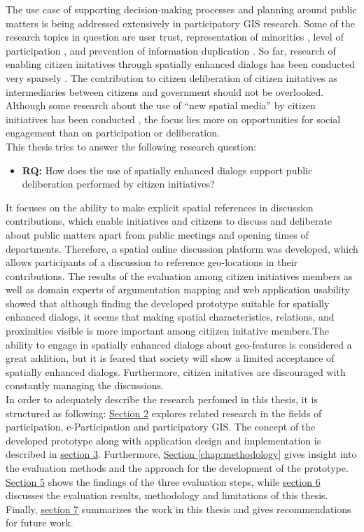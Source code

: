 The use case of supporting decision-making processes and planning around public matters is being addressed extensively in participatory GIS research. Some of the research topics in question are user trust, representation of minorities \cite{Carver2001_PPGIS_Cyberdemocracy}, level of participation \cite{Steinmann2005_Combination_Ladder_GIS}, and prevention of information duplication \cite{Hopfer2007_Communication}. So far, research of enabling citizen initatives through spatially enhanced dialogs has been conducted very sparsely \cite{Cai2009_spatial_annotation_deliberation}. The contribution to citizen deliberation of citizen initatives as intermediaries between citizens and government should not be overlooked. Although some research about the use of ``new spatial media'' by citizen initiatives has been conducted \cite{Elwood2013_NewSpatialMedia}, the focus lies more on opportunities for social engagement than on participation or deliberation.\\
This thesis tries to answer the following research question:
\begin{itemize}
  \item[] \textbf{RQ:} How does the use of spatially enhanced dialogs support public deliberation performed by citizen initiatives?
\end{itemize}
It focuses on the ability to make explicit spatial references in discussion contributions, which enable initiatives and citizens to discuss and deliberate about public matters apart from public meetings and opening times of departments. Therefore, a spatial online discussion platform was developed, which allows participants of a discussion to reference geo-locations in their contributions. The results of the evaluation among citizen initiatives members as well as domain experts of argumentation mapping and web application usability showed that although finding the developed prototype suitable for spatially enhanced dialogs, it seems that making spatial characteristics, relations, and proximities visible is more important among citiizen initative members.The ability to engage in spatially enhanced dialogs about geo-features is considered a great addition, but it is feared that society will show a limited acceptance of spatially enhanced dialogs.
Furthermore, citizen initatives are discouraged with constantly managing the discussions.\\
In order to adequately describe the research perfomed in this thesis, it is structured as following: \hyperref[chap:related_work]{Section 2} explores related research in the fields of participation, e-Participation and participatory GIS. The concept of the developed prototype along with application design and implementation is described in \hyperref[chap:approach]{section 3}. Furthermore, \hyperref[chap:methodology]{Section \ref{chap:methodology}} gives insight into the evaluation methods and the approach for the development of the prototype. \hyperref[chap:methodology]{Section 5} shows the findings of the three evaluation steps, while \hyperref[chap:discussion]{section 6} discusses the evaluation results, methodology and limitations of this thesis. Finally, \hyperref[chap:conclusion]{section 7} summarizes the work in this thesis and gives recommendations for future work.
